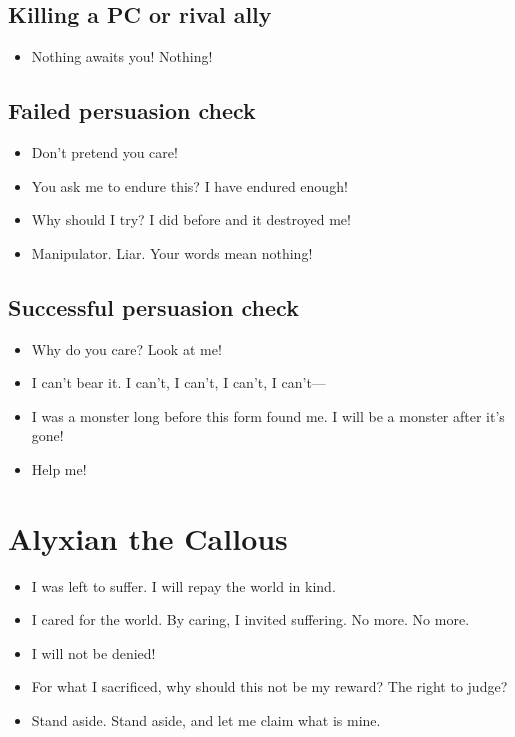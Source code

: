 \documentclass[10pt,a4paper,bg=print,twocolumn,openany,nodeprecatedcode]{dndarticle}
\begin{document}
\subsection*{Killing a PC or rival ally}
\begin{itemize}
  \item Nothing awaits you! Nothing!
\end{itemize}

\subsection*{Failed persuasion check}
\begin{itemize}
  \item Don't pretend you care!
  \item You ask me to endure this? I have endured enough!
  \item Why should I try? I did before and it destroyed me!
  \item Manipulator. Liar. Your words mean nothing!
\end{itemize}

\subsection*{Successful persuasion check}
\begin{itemize}
  \item Why do you care? Look at me!
  \item I can't bear it. I can't, I can't, I can't, I can't—
  \item I was a monster long before this form found me. I will be a monster after it's gone!
  \item Help me!
\end{itemize}

\section*{Alyxian the Callous}

\begin{itemize}
  \item I was left to suffer. I will repay the world in kind.
  \item I cared for the world. By caring, I invited suffering. No more. No more.
  \item I will not be denied!
  \item For what I sacrificed, why should this not be my reward? The right to judge?
  \item Stand aside. Stand aside, and let me claim what is mine.
\end{itemize}
\end{document}
